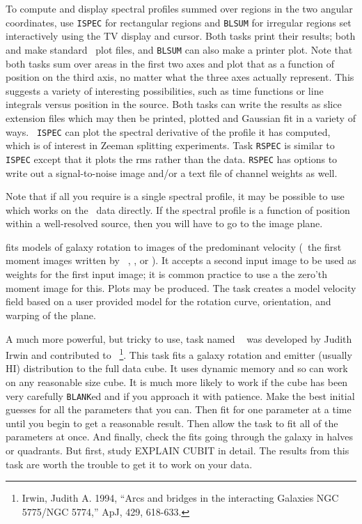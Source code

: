      To compute and display spectral profiles summed over regions in
the two angular coordinates, use {\tt ISPEC} for rectangular regions
and {\tt BLSUM} for irregular regions set interactively using the TV
display and cursor.  Both tasks print their results; both {\tt
{}} and {\tt {}} make standard \AIPS\ plot files,
and {\tt BLSUM} can also make a printer plot.  Note that both tasks
sum over areas in the first two axes and plot that as a function of
position on the third axis, no matter what the three axes actually
represent.  This suggests a variety of interesting possibilities, such
as time functions or line integrals versus position in the source.
Both tasks can write the results as slice extension files which may
then be printed, plotted and Gaussian fit in a variety of ways.  {\tt
ISPEC} can plot the spectral derivative of the profile it has
computed, which is of interest in Zeeman splitting experiments.  Task
{\tt RSPEC} is similar to {\tt ISPEC} except that it plots the rms
rather than the data.  {\tt RSPEC} has options to write out a
signal-to-noise image and/or a text file of channel weights as
well.

     Note that if all you require is a single spectral profile, it may
be possible to use {\tt {}} which works on the \uv\ data
directly. If the spectral profile is a function of position within a
well-resolved source, then you will have to go to the image plane.

    {\tt {}} fits models of galaxy rotation to images of the
predominant velocity (\eg\ the first moment images written by {\tt
{}}, {\tt {}}, or {\tt {}}).  It accepts
a second input image to be used as weights for the first input image;
it is common practice to use a the zero'th moment image for this.
Plots may be produced.  The task {\tt {}} creates a model
velocity field based on a user provided model for the rotation curve,
orientation, and warping of the plane.

     A much more powerful, but tricky to use, task named {\tt
{}} was developed by Judith Irwin and contributed to \AIPS\
\footnote{Irwin, Judith A. 1994, ``Arcs and bridges in the interacting
Galaxies NGC 5775/NGC 5774,'' ApJ, 429, 618-633.}.  This task fits a
galaxy rotation and emitter (usually HI) distribution to the full data
cube.  It uses dynamic memory and so can work on any reasonable size
cube.  It is much more likely to work if the cube has been very
carefully {\tt BLANK}ed and if you approach it with patience.  Make
the best initial guesses for all the parameters that you can.  Then
fit for one parameter at a time until you begin to get a reasonable
result.  Then allow the task to fit all of the parameters at once.
And finally, check the fits going through the galaxy in halves or
quadrants.  But first, study {\us EXPLAIN CUBIT \CR} in detail.  The
results from this task are worth the trouble to get it to work on your
data.
